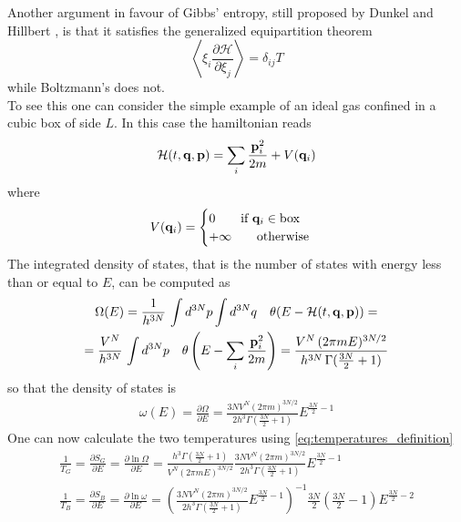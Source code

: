 Another argument in favour of Gibbs' entropy, still proposed by Dunkel and Hillbert \cite{Dunkel_Hillbert}, is that it satisfies the generalized equipartition theorem
\begin{equation}
    \left\langle\xi_{i} \frac{\partial \mathcal{H}}{\partial \xi_{j}}\right\rangle=\delta_{i j} T
    \label{eq:equipartition}
\end{equation}
while Boltzmann's does not.  \\
To see this one can consider the simple example of an ideal gas confined in a cubic box of side $L$. In this case the hamiltonian reads 
\begin{equation*}
    \mathcal{H}(t,\mathbf{q},\mathbf{p}) = \sum_i \frac{\mathbf{p}_i^2}{2m} + V(\mathbf{q}_i)
\end{equation*}
where 
\begin{equation*}
    V(\mathbf{q}_i) = 
    \begin{cases}
        0 \qquad \text{if } \mathbf{q}_i \in \text{box} \\
        +\infty \qquad \text{otherwise}
    \end{cases}
\end{equation*}
The integrated density of states, that is the number of states with energy less than or equal to $E$, can be computed as 
\begin{gather*}
    \Omega(E) = \frac{1}{h^{3N}} \, \int d^{3N}p \int d^{3N}q \quad \theta(E-\mathcal{H}(t, \mathbf{q}, \mathbf{p})) = \\ = \frac{V^N}{h^{3N}} \, \int d^{3N}p \quad \theta\left(E - \sum_i \frac{\mathbf{p}_i^2}{2m}\right) 
    = \frac{V^N \, (2\pi mE)^{3N/2}}{h^{3N} \, \Gamma(\frac{3N}{2}+1)}
\end{gather*}
so that the density of states is 
\begin{gather*}
    \omega(E)=\frac{\partial \Omega}{\partial E}=\frac{3 N V^{N}(2 \pi m)^{3 N / 2}}{2 h^{3} \Gamma\left(\frac{3 N}{2}+1\right)} E^{\frac{3 N}{2}-1}
\end{gather*}
One can now calculate the two temperatures using \ref{eq:temperatures_definition}
\begin{gather*}
    \frac{1}{T_{G}}=\frac{\partial S_{G}}{\partial E}=\frac{\partial \ln \Omega}{\partial E}=\frac{h^{3} \Gamma\left(\frac{3 N}{2}+1\right)}{V^{N}(2 \pi m E)^{3 N / 2}} \frac{3 N V^{N}(2 \pi m)^{3 N / 2}}{2 h^{3} \Gamma\left(\frac{3 N}{2}+1\right)} E^{\frac{3 N}{2}-1} \\
    \frac{1}{T_{B}}=\frac{\partial S_{B}}{\partial E}=\frac{\partial \ln \omega}{\partial E}=\left(\frac{3 N V^{N}(2 \pi m)^{3 N / 2}}{2 h^{3} \Gamma\left(\frac{3 N}{2}+1\right)} E^{\frac{3 N}{2}-1}\right)^{-1} \frac{3 N}{2}\left(\frac{3 N}{2}-1\right) E^{\frac{3 N}{2}-2}
\end{gather*}

